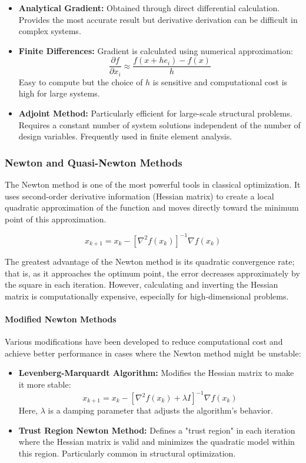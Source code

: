 \begin{itemize}
    \item \textbf{Analytical Gradient:} Obtained through direct differential calculation. Provides the most accurate result but derivative derivation can be difficult in complex systems.
    
    \item \textbf{Finite Differences:} Gradient is calculated using numerical approximation:
    $$\frac{\partial f}{\partial x_i} \approx \frac{f(x + h e_i) - f(x)}{h}$$
    Easy to compute but the choice of $h$ is sensitive and computational cost is high for large systems.
    
    \item \textbf{Adjoint Method:} Particularly efficient for large-scale structural problems. Requires a constant number of system solutions independent of the number of design variables. Frequently used in finite element analysis.
\end{itemize}

\subsubsection{Newton and Quasi-Newton Methods}
The Newton method is one of the most powerful tools in classical optimization. It uses second-order derivative information (Hessian matrix) to create a local quadratic approximation of the function and moves directly toward the minimum point of this approximation.

\begin{equation}
x_{k+1} = x_k - [\nabla^2 f(x_k)]^{-1} \nabla f(x_k)
\end{equation}

The greatest advantage of the Newton method is its quadratic convergence rate; that is, as it approaches the optimum point, the error decreases approximately by the square in each iteration. However, calculating and inverting the Hessian matrix is computationally expensive, especially for high-dimensional problems.

\paragraph{Modified Newton Methods}
Various modifications have been developed to reduce computational cost and achieve better performance in cases where the Newton method might be unstable:

\begin{itemize}
    \item \textbf{Levenberg-Marquardt Algorithm:} Modifies the Hessian matrix to make it more stable:
    $$x_{k+1} = x_k - [\nabla^2 f(x_k) + \lambda I]^{-1} \nabla f(x_k)$$
    Here, $\lambda$ is a damping parameter that adjusts the algorithm's behavior.
    
    \item \textbf{Trust Region Newton Method:} Defines a "trust region" in each iteration where the Hessian matrix is valid and minimizes the quadratic model within this region. Particularly common in structural optimization.
\end{itemize}

